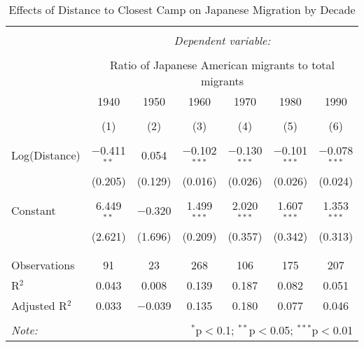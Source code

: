 
\begin{table}[!htbp] \centering 
  \caption{Effects of Distance to Closest Camp on Japanese Migration by Decade} 
  \label{tbl:distreg} 
\begin{tabular}{@{\extracolsep{1pt}}lcccccc} 
\\[-1.8ex]\hline 
\hline \\[-1.8ex] 
 & \multicolumn{6}{c}{\textit{Dependent variable:}} \\ 
\cline{2-7} 
\\[-1.8ex] & \multicolumn{6}{c}{Ratio of Japanese American migrants to total migrants} \\ 
 & 1940 & 1950 & 1960 & 1970 & 1980 & 1990 \\ 
\\[-1.8ex] & (1) & (2) & (3) & (4) & (5) & (6)\\ 
\hline \\[-1.8ex] 
 Log(Distance) & $-$0.411$^{**}$ & 0.054 & $-$0.102$^{***}$ & $-$0.130$^{***}$ & $-$0.101$^{***}$ & $-$0.078$^{***}$ \\ 
  & (0.205) & (0.129) & (0.016) & (0.026) & (0.026) & (0.024) \\ 
  & & & & & & \\ 
 Constant & 6.449$^{**}$ & $-$0.320 & 1.499$^{***}$ & 2.020$^{***}$ & 1.607$^{***}$ & 1.353$^{***}$ \\ 
  & (2.621) & (1.696) & (0.209) & (0.357) & (0.342) & (0.313) \\ 
  & & & & & & \\ 
\hline \\[-1.8ex] 
Observations & 91 & 23 & 268 & 106 & 175 & 207 \\ 
R$^{2}$ & 0.043 & 0.008 & 0.139 & 0.187 & 0.082 & 0.051 \\ 
Adjusted R$^{2}$ & 0.033 & $-$0.039 & 0.135 & 0.180 & 0.077 & 0.046 \\ 
\hline 
\hline \\[-1.8ex] 
\textit{Note:}  & \multicolumn{6}{r}{$^{*}$p$<$0.1; $^{**}$p$<$0.05; $^{***}$p$<$0.01} \\ 
\end{tabular} 
\end{table} 

